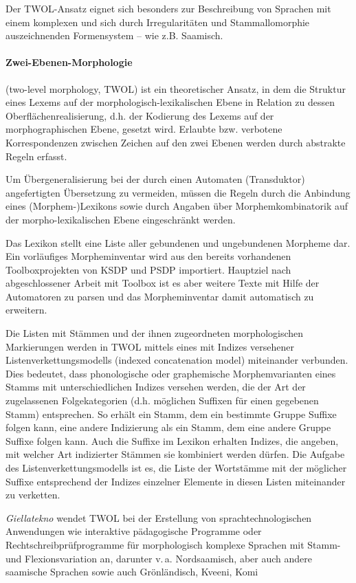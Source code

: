 \documentclass[a4paper,12pt]{article}
\begin{document}
Der TWOL-Ansatz eignet sich besonders zur Beschreibung von Sprachen mit einem komplexen und sich durch Irregularitäten und Stammallomorphie auszeichnenden Formensystem – wie z.B. Saamisch. 

\paragraph{Zwei-Ebenen-Morphologie} (two-level morphology, TWOL) ist ein theoretischer Ansatz, in dem die Struktur eines Lexems auf der morphologisch-lexikalischen Ebene in Relation zu dessen Oberflächenrealisierung, d.h. der Kodierung des Lexems auf der morphographischen Ebene, gesetzt wird. Erlaubte bzw. verbotene Korrespondenzen zwischen Zeichen auf den zwei Ebenen werden durch abstrakte Regeln erfasst.

Um Übergeneralisierung bei der durch einen Automaten (Transduktor) angefertigten Übersetzung zu vermeiden, müssen die Regeln durch die Anbindung eines (Morphem-)Lexikons sowie durch Angaben über Morphemkombinatorik auf der morpho-lexikalischen Ebene eingeschränkt werden.

Das Lexikon stellt eine Liste aller gebundenen und ungebundenen Morpheme dar. Ein vorläufiges Morpheminventar wird aus den bereits vorhandenen Toolboxprojekten von KSDP und PSDP importiert. Hauptziel nach abgeschlossener Arbeit mit Toolbox ist es aber weitere Texte mit Hilfe der Automatoren zu parsen und das Morpheminventar damit automatisch zu erweitern.

Die Listen mit Stämmen und der ihnen zugeordneten morphologischen Markierungen werden in TWOL mittels eines mit Indizes versehener Listenverkettungsmodells (indexed concatenation model) miteinander verbunden. Dies bedeutet, dass phonologische oder graphemische Morphemvarianten eines Stamms mit unterschiedlichen Indizes versehen werden, die der Art der zugelassenen Folgekategorien (d.h. möglichen Suffixen für einen gegebenen Stamm) entsprechen. So erhält ein Stamm, dem ein bestimmte Gruppe Suffixe folgen kann, eine andere Indizierung als ein Stamm, dem eine andere Gruppe Suffixe folgen kann. Auch die Suffixe im Lexikon erhalten Indizes, die angeben, mit welcher Art indizierter Stämmen sie kombiniert werden dürfen. Die Aufgabe des Listenverkettungsmodells ist es, die Liste der Wortstämme mit der möglicher Suffixe entsprechend der Indizes einzelner Elemente in diesen Listen miteinander zu verketten.

\textit{Giellatekno} wendet TWOL bei der Erstellung von sprachtechnologischen Anwendungen wie interaktive pädagogische Programme oder Rechtschreibprüfprogramme für morphologisch komplexe Sprachen mit Stamm- und Flexionsvariation an, darunter v.\,a. Nordsaamisch, aber auch andere saamische Sprachen sowie auch Grönländisch, Kveeni, Komi
\end{document}
